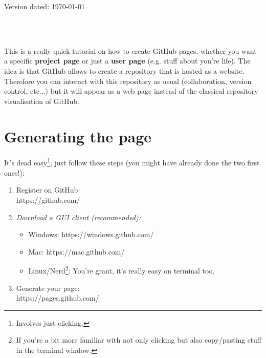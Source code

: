 \documentclass[a4paper,11pt]{article}
\begin{document}
\begin{flushright}
Version dated: \today
\end{flushright}
\begin{center}

\\
\bigskip
\\

\end{center}

This is a really quick tutorial on how to create GitHub pages, whether you want a specific \textbf{project page} or just a \textbf{user page} (e.g. stuff about you're life).
The idea is that GitHub allows to create a repository that is hosted as a website.
Therefore you can interact with this repository as usual (collaboration, version control, etc...) but it will appear as a web page instead of the classical repository visualisation of GitHub.
\section{Generating the page}
It's dead easy\footnote{Involves just clicking.}, just follow these steps (you might have already done the two first ones!):
\begin{enumerate}
    \item{Register on GitHub:}\\
    https://github.com/

    \item{\textit{Download a GUI client (recommended):}}\\
        \begin{itemize}
        \item{Windows: https://windows.github.com/}
        \item{Mac: https://mac.github.com/}
        \item{Linux/Nerd\footnote{If you're a bit more familiar with not only clicking but also copy/pasting stuff in the terminal window.}: You're grant, it's really easy on terminal too.}
        \end{itemize}

    \item{Generate your page:}\\
    https://pages.github.com/
\end{enumerate}
\end{document}
